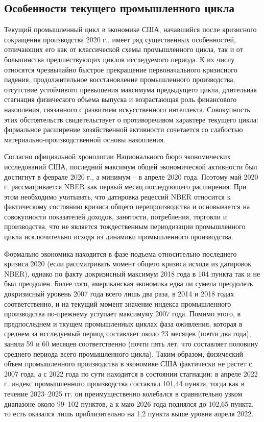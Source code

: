 \subsection{Особенности текущего промышленного цикла}
Текущий промышленный цикл в экономике США, начавшийся после кризисного сокращения производства 2020 г., имеет ряд существенных особенностей, отличающих его как от классической схемы промышленного цикла, так и от большинства предшествующих циклов исследуемого периода. К их числу относятся чрезвычайно быстрое прекращение первоначального кризисного падения, продолжительное восстановление промышленного производства, отсутствие устойчивого превышения максимума предыдущего цикла, длительная стагнация физического объема выпуска и возрастающая роль финансового накопления, связанного с развитием искусственного интеллекта. Совокупность этих обстоятельств свидетельствует о противоречивом характере текущего цикла: формальное расширение хозяйственной активности сочетается со слабостью материально-производственной основы накопления.

Согласно официальной хронологии Национального бюро экономических исследований США, последний максимум общей экономической активности был достигнут в феврале 2020 г., а минимум – в апреле 2020 года. Поэтому май 2020 г. рассматривается NBER как первый месяц последующего расширения. При этом необходимо учитывать, что датировка рецессий NBER относится к фактическому состоянию кризиса общего перепроизводства и основывается на совокупности показателей доходов, занятости, потребления, торговли и производства, что не является тождественным периодизации промышленного цикла исключительно исходя из динамики промышленного производства.

Формально экономика находится в фазе подъема относительно последнего кризиса 2020 (если рассматривать момент общего кризиса исходя из датировок NBER), однако по факту докризисный максимум 2018 года в 104 пункта так и не был преодолен. Более того, американская экономика едва ли сумела преодолеть докризисный уровень 2007 года всего лишь два раза, в 2014 и 2018 годах соответственно, и на текущий момент значение индекса промышленного производства по-прежнему уступает максимуму 2007 года. Помимо этого, в предпоследнем и ткущем промышленных циклах фаза оживления, которая в среднем за исследуемый период составляет около 23 месяцев (почти два года), заняла 59 и 60 месяцев соответственно (почти пять лет, что составляет половину среднего периода всего промышленного цикла). Таким образом, физический объем промышленного производства в экономике США фактически не растет с 2007 года, а с 2022 года по сути находится в состоянии стагнации: в апреле 2022 г. индекс промышленного производства составлял 101,44 пункта, тогда как в течение 2023–2025 гг. он преимущественно колебался в сравнительно узком диапазоне около 99–102 пунктов, а к маю 2026 года поднялся до 102,65 пункта, то есть оказался лишь приблизительно на 1,2 пункта выше уровня апреля 2022.

